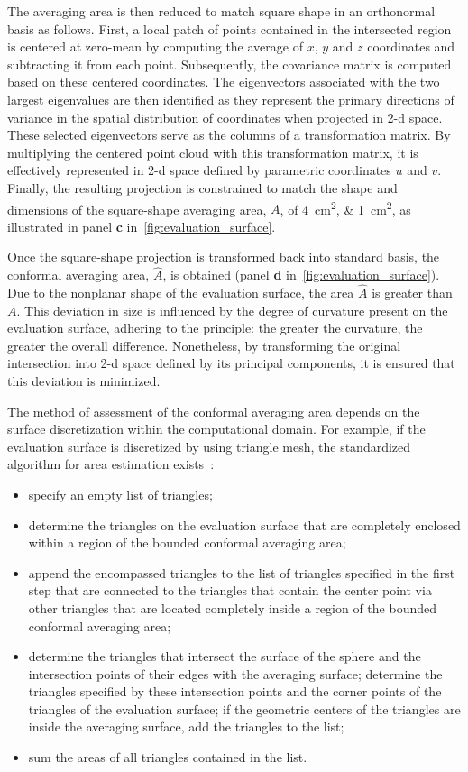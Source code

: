 The averaging area is then reduced to match square shape in an orthonormal basis as follows.
First, a local patch of points contained in the intersected region is centered at zero-mean by computing the average of $x$, $y$ and $z$ coordinates and subtracting it from each point.
Subsequently, the covariance matrix is computed based on these centered coordinates.
The eigenvectors associated with the two largest eigenvalues are then identified as they represent the primary directions of variance in the spatial distribution of coordinates when projected in \gls{2-d} space.
These selected eigenvectors serve as the columns of a transformation matrix.
By multiplying the centered point cloud with this transformation matrix, it is effectively represented in \gls{2-d} space defined by parametric coordinates $u$ and $v$.
Finally, the resulting projection is constrained to match the shape and dimensions of the square-shape averaging area, $A$, of \SIlist{4;1}{\cm\squared}, as illustrated in panel \textbf{c} in~\cref{fig:evaluation_surface}.

Once the square-shape projection is transformed back into standard basis, the conformal averaging area, $\hat A$, is obtained (panel \textbf{d} in~\cref{fig:evaluation_surface}).
Due to the nonplanar shape of the evaluation surface, the area $\hat A$ is greater than $A$.
This deviation in size is influenced by the degree of curvature present on the evaluation surface, adhering to the principle: the greater the curvature, the greater the overall difference.
Nonetheless, by transforming the original intersection into \gls{2-d} space defined by its principal components, it is ensured that this deviation is minimized.

The method of assessment of the conformal averaging area depends on the surface discretization within the computational domain.
For example, if the evaluation surface is discretized by using triangle mesh, the standardized algorithm for area estimation exists~\cite{IEC63195-2-2022}:
\begin{itemize}
    \item specify an empty list of triangles;
    \item determine the triangles on the evaluation surface that are completely enclosed within a region of the bounded conformal averaging area;
    \item append the encompassed triangles to the list of triangles specified in the first step that are connected to the triangles that contain the center point via other triangles that are located completely inside a region of the bounded conformal averaging area;
    \item determine the triangles that intersect the surface of the sphere and the intersection points of their edges with the averaging surface; determine the triangles specified by these intersection points and the corner points of the triangles of the evaluation surface; if the geometric centers of the triangles are inside the averaging surface, add the triangles to the list;
    \item sum the areas of all triangles contained in the list.
\end{itemize}

